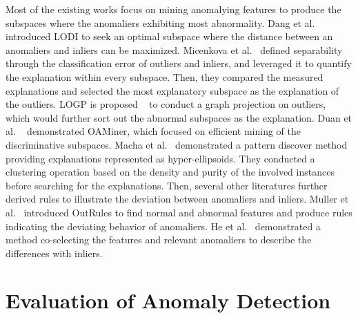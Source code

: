 Most of the existing works focus on mining anomalying features to
produce the subspaces where
the anomaliers exhibiting most abnormality.
Dang et al.~\cite{dang2013local} introduced LODI to
seek an optimal subspace where
the distance between an anomaliers and
inliers can be maximized.
Micenkova et al.~\cite{micenkova2013explaining}
defined separability through the classification error of outliers and
inliers,
and leveraged it to
quantify the explanation within every subspace.
Then,
they compared the measured explanations and
selected the most explanatory subspace as the explanation of the outliers.
LOGP is proposed ~\cite{dang2014discriminative}  to
conduct a graph projection on outliers,
which would further sort out the abnormal subspaces as the explanation.
Duan et al. ~\cite{duan2015mining}
demonstrated OAMiner,
which focused on efficient mining of the discriminative subspaces.
Macha et al.~\cite{macha2018explaining}
demonstrated a pattern discover method providing explanations represented as hyper-ellipsoids.
They conducted a clustering operation based on the density and
purity of the involved instances before searching for the explanations.
Then,
several other literatures further derived rules to
illustrate the deviation between anomaliers and
inliers.
Muller et al.~\cite{muller2012outrules}
introduced OutRules to
find normal and abnormal features and
produce rules indicating the deviating behavior of anomaliers.
He et al.~\cite{he2010co}
demonstrated a method co-selecting the features and
relevant anomaliers to
describe the differences with inliers.


\section{Evaluation of Anomaly Detection}

